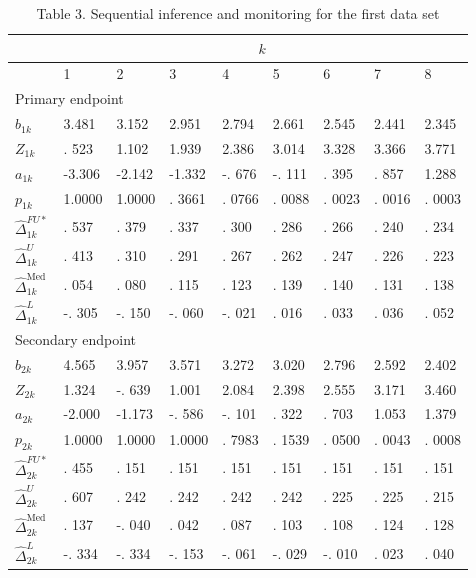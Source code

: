 \documentclass[10pt]{article}
\begin{document}
\begin{table}[h]
\begin{center}
\captionsetup{labelformat=empty}
\caption{Table 3. Sequential inference and monitoring for the first data set}
\begin{tabular}[t]{|l|l|l|l|l|l|l|l|l|}
\hline
\multirow{2}{*}{} & \multicolumn{8}{|c|}{$k$} \\
\hline
 & 1 & 2 & 3 & 4 & 5 & 6 & 7 & 8 \\
\hline
\multicolumn{9}{|l|}{Primary endpoint} \\
\hline
$b_{1 k}$ & 3.481 & 3.152 & 2.951 & 2.794 & 2.661 & 2.545 & 2.441 & 2.345 \\
\hline
$Z_{1 k}$ & . 523 & 1.102 & 1.939 & 2.386 & 3.014 & 3.328 & 3.366 & 3.771 \\
\hline
$a_{1 k}$ & -3.306 & -2.142 & -1.332 & -. 676 & -. 111 & . 395 & . 857 & 1.288 \\
\hline
$p_{1 k}$ & 1.0000 & 1.0000 & . 3661 & . 0766 & . 0088 & . 0023 & . 0016 & . 0003 \\
\hline
$\hat{\Delta}_{1 k}^{F U *}$ & . 537 & . 379 & . 337 & . 300 & . 286 & . 266 & . 240 & . 234 \\
\hline
$\hat{\Delta}_{1 k}^{U}$ & . 413 & . 310 & . 291 & . 267 & . 262 & . 247 & . 226 & . 223 \\
\hline
$\hat{\Delta}_{1 k}^{\text {Med }}$ & . 054 & . 080 & . 115 & . 123 & . 139 & . 140 & . 131 & . 138 \\
\hline
$\hat{\Delta}_{1 k}^{L}$ & -. 305 & -. 150 & -. 060 & -. 021 & . 016 & . 033 & . 036 & . 052 \\
\hline
\multicolumn{9}{|l|}{Secondary endpoint} \\
\hline
$b_{2 k}$ & 4.565 & 3.957 & 3.571 & 3.272 & 3.020 & 2.796 & 2.592 & 2.402 \\
\hline
$Z_{2 k}$ & 1.324 & -. 639 & 1.001 & 2.084 & 2.398 & 2.555 & 3.171 & 3.460 \\
\hline
$a_{2 k}$ & -2.000 & -1.173 & -. 586 & -. 101 & . 322 & . 703 & 1.053 & 1.379 \\
\hline
$p_{2 k}$ & 1.0000 & 1.0000 & 1.0000 & . 7983 & . 1539 & . 0500 & . 0043 & . 0008 \\
\hline
$\hat{\Delta}_{2 k}^{F U *}$ & . 455 & . 151 & . 151 & . 151 & . 151 & . 151 & . 151 & . 151 \\
\hline
$\hat{\Delta}_{2 k}^{U}$ & . 607 & . 242 & . 242 & . 242 & . 242 & . 225 & . 225 & . 215 \\
\hline
$\hat{\Delta}_{2 k}^{\text {Med }}$ & . 137 & -. 040 & . 042 & . 087 & . 103 & . 108 & . 124 & . 128 \\
\hline
$\hat{\Delta}_{2 k}^{L}$ & -. 334 & -. 334 & -. 153 & -. 061 & -. 029 & -. 010 & . 023 & . 040 \\
\hline
\end{tabular}
\end{center}
\end{table}
\end{document}
